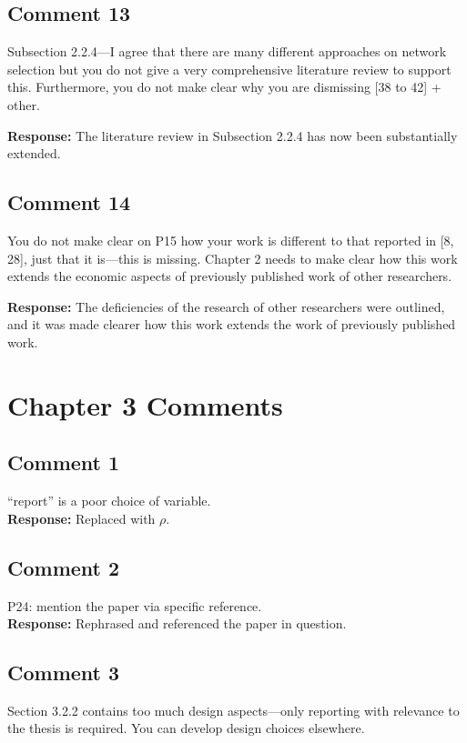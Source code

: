 \documentclass[10pt,a4paper,notitlepage]{article}
\numberwithin{equation}{section}
\begin{document}
\subsection{Comment 13}
Subsection 2.2.4---I agree that there are many different approaches on network selection but you do not give a very comprehensive literature review to support this. Furthermore, you do not make clear why you are dismissing [38 to 42] + other.

\textbf{Response:}
The literature review in Subsection 2.2.4 has now been substantially extended.

\subsection{Comment 14}
You do not make clear on P15 how your work is different to that reported in [8, 28], just that it is---this is missing. Chapter 2 needs to make clear how this work extends the economic aspects of previously published work of other researchers.

\textbf{Response:}
The deficiencies of the research of other researchers were outlined, and it was made clearer how this work extends the work of previously published work.

\clearpage

\section{Chapter 3 Comments}
\subsection{Comment 1}
``report'' is a poor choice of variable.\\[-2ex]

\textbf{Response:}
Replaced with $\rho$.

\subsection{Comment 2}
P24: mention the paper via specific reference.\\[-2ex]

\textbf{Response:}
Rephrased and referenced the paper in question.

\subsection{Comment 3}
Section 3.2.2 contains too much design aspects---only reporting with relevance to the thesis is required. You can develop design choices elsewhere.\\[-2ex]
\end{document}
